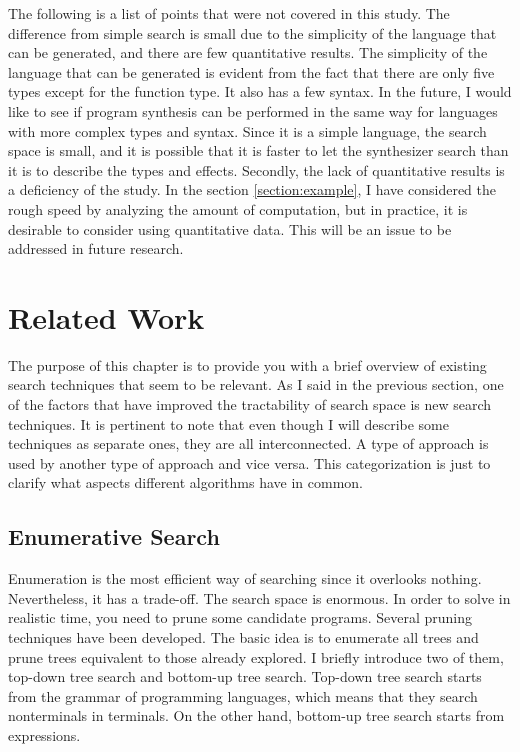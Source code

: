 \documentclass[12pt, a4paper, titlepage]{report}
\begin{document}
  The following is a list of points that were not covered in this study.
  The difference from simple search is small due to the simplicity of the language that can be generated, and there are few quantitative results.
  The simplicity of the language that can be generated is evident from the fact that there are only five types except for the function type.
  It also has a few syntax.
  In the future, I would like to see if program synthesis can be performed in the same way for languages with more complex types and syntax.
  Since it is a simple language, the search space is small, and it is possible that it is faster to let the synthesizer search than it is to describe the types and effects.
  Secondly, the lack of quantitative results is a deficiency of the study.
  In the section \ref{section:example}, I have considered the rough speed by analyzing the amount of computation, but in practice, it is desirable to consider using quantitative data.
  This will be an issue to be addressed in future research.

\chapter{Related Work}\label{chapter:relatedWork}
  The purpose of this chapter is to provide you with a brief overview of existing search techniques that seem to be relevant. As I said in the previous section, one of the factors that have improved the tractability of search space is new search techniques.
  It is pertinent to note that even though I will describe some techniques as separate ones, they are all interconnected. A type of approach is used by another type of approach and vice versa. This categorization is just to clarify what aspects different algorithms have in common.

  \section{Enumerative Search}
  Enumeration is the most efficient way of searching since it overlooks nothing.
  Nevertheless, it has a trade-off.
  The search space is enormous.
  In order to solve in realistic time, you need to prune some candidate programs.
  Several pruning techniques have been developed.
  The basic idea is to enumerate all trees and prune trees equivalent to those already explored.
  I briefly introduce two of them, top-down tree search and bottom-up tree search.
  Top-down tree search starts from the grammar of programming languages, which means that they search nonterminals in terminals.
  On the other hand, bottom-up tree search starts from expressions.
\end{document}
